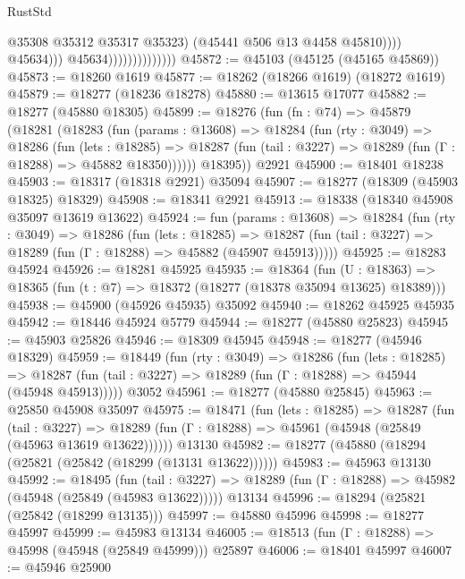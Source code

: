 \begin{lexlean}{RustStd}
\begin{coremodule}
                                              @35308
                                              @35312
                                              @35317
                                              @35323)
                                            (@45441 @506 @13 @4458 @45810))))
                                      @45634)))
                                @45634))))))))))))))
@45872 := @45103 (@45125 (@45165 @45869))
@45873 := @18260 @1619
@45877 := @18262 (@18266 @1619) (@18272 @1619)
@45879 := @18277 (@18236 @18278)
@45880 := @13615 @17077
@45882 := @18277 (@45880 @18305)
@45899 := @18276
    (fun (fn : @74) =>
    @45879
      (@18281
        (@18283
          (fun (params : @13608) =>
          @18284
            (fun (rty : @3049) =>
            @18286
              (fun (lets : @18285) =>
              @18287 (fun (tail : @3227) => @18289 (fun (Γ : @18288) => @45882 @18350))))))
        @18395))
    @2921
@45900 := @18401 @18238
@45903 := @18317 (@18318 @2921) @35094
@45907 := @18277 (@18309 (@45903 @18325) @18329)
@45908 := @18341 @2921
@45913 := @18338 (@18340 @45908 @35097 @13619 @13622)
@45924 := fun (params : @13608) =>
  @18284
    (fun (rty : @3049) =>
    @18286
      (fun (lets : @18285) =>
      @18287 (fun (tail : @3227) => @18289 (fun (Γ : @18288) => @45882 (@45907 @45913)))))
@45925 := @18283 @45924
@45926 := @18281 @45925
@45935 := @18364
    (fun (U : @18363) => @18365 (fun (t : @7) => @18372 (@18277 (@18378 @35094 @13625) @18389)))
@45938 := @45900 (@45926 @45935) @35092
@45940 := @18262 @45925 @45935
@45942 := @18446 @45924 @5779
@45944 := @18277 (@45880 @25823)
@45945 := @45903 @25826
@45946 := @18309 @45945
@45948 := @18277 (@45946 @18329)
@45959 := @18449
    (fun (rty : @3049) =>
    @18286
      (fun (lets : @18285) =>
      @18287 (fun (tail : @3227) => @18289 (fun (Γ : @18288) => @45944 (@45948 @45913)))))
    @3052
@45961 := @18277 (@45880 @25845)
@45963 := @25850 @45908 @35097
@45975 := @18471
    (fun (lets : @18285) =>
    @18287
      (fun (tail : @3227) =>
      @18289 (fun (Γ : @18288) => @45961 (@45948 (@25849 (@45963 @13619 @13622))))))
    @13130
@45982 := @18277 (@45880 (@18294 (@25821 (@25842 (@18299 (@13131 @13622))))))
@45983 := @45963 @13130
@45992 := @18495
    (fun (tail : @3227) => @18289 (fun (Γ : @18288) => @45982 (@45948 (@25849 (@45983 @13622)))))
    @13134
@45996 := @18294 (@25821 (@25842 (@18299 @13135)))
@45997 := @45880 @45996
@45998 := @18277 @45997
@45999 := @45983 @13134
@46005 := @18513 (fun (Γ : @18288) => @45998 (@45948 (@25849 @45999))) @25897
@46006 := @18401 @45997
@46007 := @45946 @25900

\end{coremodule}
\end{lexlean}
